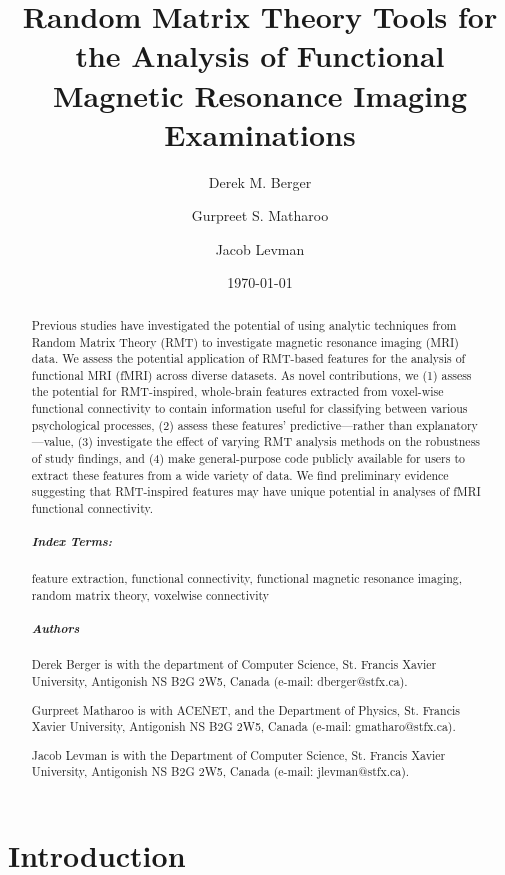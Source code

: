 

\title{Random Matrix Theory Tools for the Analysis of Functional Magnetic Resonance Imaging Examinations}
\author{Derek M. Berger \and Gurpreet S. Matharoo \and Jacob Levman}
\date{\today}


\maketitle


\begin{abstract}
    Previous studies have investigated the potential of using analytic techniques from Random Matrix
    Theory (RMT) to investigate magnetic resonance imaging (MRI) data. We assess the potential
    application of RMT-based features for the analysis of functional MRI (fMRI) across diverse
    datasets. As novel contributions, we (1) assess the potential for RMT-inspired, whole-brain
    features extracted from voxel-wise functional connectivity to contain information useful for
    classifying between various psychological processes, (2) assess these features’
    predictive—rather than explanatory—value, (3) investigate the effect of varying RMT analysis
    methods on the robustness of study findings, and (4) make general-purpose code publicly
    available for users to extract these features from a wide variety of data. We find preliminary
    evidence suggesting that RMT-inspired features may have unique potential in analyses of fMRI
    functional connectivity.

    \subparagraph{Index Terms:} feature extraction, functional connectivity, functional magnetic
    resonance imaging, random matrix theory, voxelwise connectivity

    \subparagraph{Authors}
    Derek Berger is with the department of Computer Science, St. Francis Xavier University, Antigonish
    NS B2G 2W5, Canada (e-mail: dberger@stfx.ca).

    Gurpreet Matharoo is with ACENET, and the Department of Physics, St. Francis Xavier University,
    Antigonish NS B2G 2W5, Canada (e-mail: gmatharo@stfx.ca).

    Jacob Levman is with the Department of Computer Science, St. Francis Xavier University,
    Antigonish NS B2G 2W5, Canada (e-mail: jlevman@stfx.ca).
\end{abstract}


\section{Introduction}

